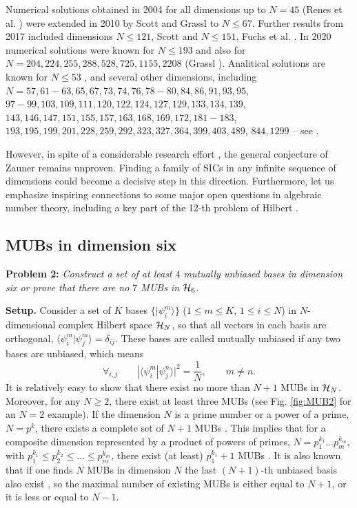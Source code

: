 \documentclass[english,aps,pra,nofootinbib,twocolumn,superscriptaddress]{revtex4-1}
\newcommand{\1}{{\rm 1\hspace{-0.9mm}l}}
\begin{document}
Numerical solutions obtained in 2004 for all dimensions up to  $N =45$  (Renes et al. \cite{RBSC04}) were
extended  in 2010   by Scott and Grassl \cite{SG10} to  $N \le 67$.
Further results from 2017 included dimensions
$ N\le 121$, Scott  \cite{Sc17} and  $ N\le 151$,  Fuchs et al.  \cite{FHS17}.
In 2020 numerical solutions were known for
$ N \le 193$ and also for
$ N = 204, 224, 255, 288, 528, 725, 1155, 2208$ (Grassl  \cite{Gra20}).
Analitical solutions are known  
for $N\le 53$ \cite{RBSC04,SG10,Sc17,ACFW18},
and several other dimensions, including
 $N=57, 61-63, 65, 67, 73, 74, 76, 78-80, 84, 86, 91, 93, 95$,
$ 97-99, 103, 109, 111, 120, 122, 124, 127, 129, 133, 134, 139$, 
$143, 146, 147, 151, 155, 157, 163, 168, 169, 172,181-183$, 
$193, 195, 199, 201, 228, 259, 292, 323, 327, 364, 399, 403, 489$,
$ 844, 1299$ -- see \cite{GS17, AB19, Gra20}.

However, in spite of a considerable  research effort 
   \cite{Zhu10, JW15, ABDF17,AD19,IngemarNEW},
the general conjecture of Zauner remains unproven.
Finding a family of SICs in any infinite sequence of dimensions
could become a decisive step in this direction.
Furthermore, let us emphasize inspiring connections
to some major open questions in algebraic number theory, 
including a key part of  the  12-th
 problem of Hilbert \cite{AHAZ13, AFMCY17,Ko18,Ingemar2020}. 


\subsection{MUBs in dimension six}

{\bf Problem 2:} {\sl Construct a set of {\sl at least} $4$  mutually unbiased bases
      in dimension six or prove that  there are no $7$ MUBs in ${\cal H}_6$.}                               

\bigskip

{\bf  Setup.} 
Consider a set of $K$ bases  $\{ |\psi_{i}^{m}\rangle \}$
 ($1 \leq m \leq K$, $1 \leq i \leq N$) in $N$-dimensional complex
 Hilbert space ${\cal H}_N$,
 so that all  vectors in each basis are orthogonal,
$\langle  \psi_{i}^{m} |  \psi_{j}^{m} \rangle = \delta_{ij}$.
 These bases are called mutually unbiased
if any two bases are unbiased, which means
 \begin{equation}
\forall_{i,j} \qquad |\langle  \psi_{i}^{m} |  \psi_{j}^{n} \rangle|^2 = \frac{1}{N}, \qquad m\neq n.
\end{equation}
It is relatively easy to show that  there exist  no more than $N+1$  MUBs in ${\cal H}_N$.
Moreover, for any $N\ge 2$, there exist at least three MUBs (see Fig. \ref{fig:MUB2} for an $N=2$ example).
If the dimension $N$ is a prime number or a power of a prime, $N=p^k$,
there exists a complete set of $N+1$ MUBs  \cite{Iv81,Wo89}.
This implies that for a composite dimension represented 
by a product of powers of primes, $N=p_1^{k_1}\dots p_m^{k_m}$,
with $p_1^{k_1} \le p_2^{k_2} \le \dots \le p_m^{k_m}$,
there exist (at least) $p_1^{k_1}+1$ MUBs \cite{Za99,KR04}.
It is also known that if one finds $N$ MUBs in dimension $N$
the last $(N+1)$-th unbiased basis also exist \cite{We13},
so the maximal number of existing MUBs is either equal to $N+1$,
or it is less or equal to $N-1$. 
\end{document}
